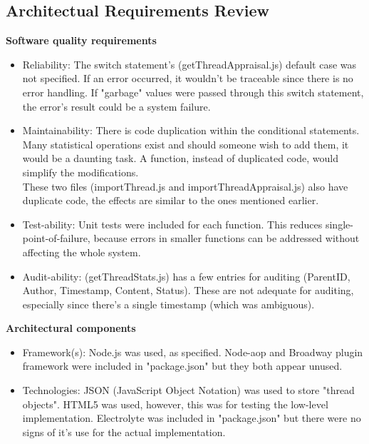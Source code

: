 \subsection{Architectual Requirements Review}

\textbf{Software quality requirements} \\
\begin{itemize}
\item Reliability: The switch statement's (getThreadAppraisal.js) default case was not specified. If an error occurred, it wouldn't be traceable since there is no error handling. If "garbage" values were passed through this switch statement, the error's result could be a system failure.
\item Maintainability: There is code duplication within the conditional statements. Many statistical operations exist and should someone wish to add them, it would be a daunting task. A function, instead of duplicated code, would simplify the modifications. \\
These two files (importThread.js and importThreadAppraisal.js) also have duplicate code, the effects are similar to the ones mentioned earlier.
\item Test-ability: Unit tests were included for each function. This reduces single-point-of-failure, because errors in smaller functions can be addressed without affecting the whole system.
\item Audit-ability: (getThreadStats.js) has a few entries for auditing (ParentID, Author, Timestamp, Content, Status). These are not adequate for auditing, especially since there's a single timestamp (which was ambiguous). \\
\end{itemize}
\textbf{Architectural components}
\begin{itemize}
\item Framework(s): Node.js was used, as specified. Node-aop and Broadway plugin framework were included in "package.json"  but they both appear unused.
\item Technologies: JSON (JavaScript Object Notation) was used to store "thread objects". HTML5 was used, however, this was for testing the low-level implementation. Electrolyte was included in "package.json" but there were no signs of it's use for the actual implementation.
\end{itemize}